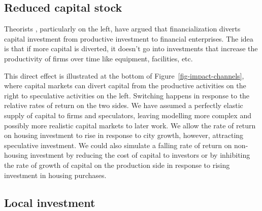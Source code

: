 
\subsection{Reduced capital stock}

Theorists \cite{lefebvreRevolutionUrbaine1970, harveyClassmonopolyRentFinance1974, harveyUrbanProcessCapitalism1978, christophersRevisitingUrbanizationCapital2011}, particularly on the left, have argued that financialization diverts capital investment from productive investment to financial enterprises. The idea is that if more capital is diverted, it doesn't go into investments that increase the productivity of firms over time like equipment, facilities, etc. 

This direct effect is illustrated at the bottom of Figure~\ref{fig-impact-channels}, where capital markets can divert capital from the productive activities on the right to speculative activities on the left. Switching happens in response to the relative rates of return on the two sides. We have assumed a perfectly elastic supply of capital to firms and speculators, leaving modelling more complex and possibly more realistic capital markets to later work. We allow the rate of return on housing investment to rise in response to city growth, however, attracting speculative investment. We could also simulate a falling rate of return on non-housing investment by reducing the cost of capital to investors or by inhibiting the rate of growth of capital on the production side in response to rising investment in housing purchases. %


\subsection{Local investment}

